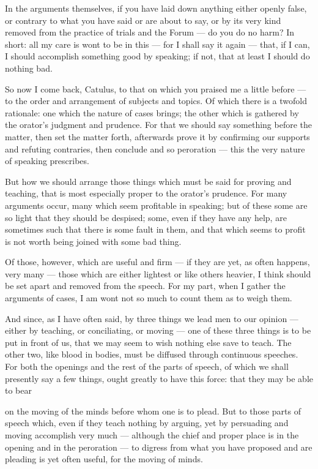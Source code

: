  In the arguments themselves, if you have laid down anything either openly false, or contrary to what you have said or are about to say, or by its very kind removed from the practice of trials and the Forum — do you do no harm? In short: all my care is wont to be in this — for I shall say it again — that, if I can, I should accomplish something good by speaking; if not, that at least I should do nothing bad.

 So now I come back, Catulus, to that on which you praised me a little before — to the order and arrangement of subjects and topics. Of which there is a twofold rationale: one which the nature of cases brings; the other which is gathered by the orator's judgment and prudence. For that we should say something before the matter, then set the matter forth, afterwards prove it by confirming our supports and refuting contraries, then conclude and so peroration — this the very nature of speaking prescribes.

 But how we should arrange those things which must be said for proving and teaching, that is most especially proper to the orator's prudence. For many arguments occur, many which seem profitable in speaking; but of these some are so light that they should be despised; some, even if they have any help, are sometimes such that there is some fault in them, and that which seems to profit is not worth being joined with some bad thing.

 Of those, however, which are useful and firm — if they are yet, as often happens, very many — those which are either lightest or like others heavier, I think should be set apart and removed from the speech. For my part, when I gather the arguments of cases, I am wont not so much to count them as to weigh them.

 And since, as I have often said, by three things we lead men to our opinion — either by teaching, or conciliating, or moving — one of these three things is to be put in front of us, that we may seem to wish nothing else save to teach. The other two, like blood in bodies, must be diffused through continuous speeches. For both the openings and the rest of the parts of speech, of which we shall presently say a few things, ought greatly to have this force: that they may be able to bear

 on the moving of the minds before whom one is to plead. But to those parts of speech which, even if they teach nothing by arguing, yet by persuading and moving accomplish very much — although the chief and proper place is in the opening and in the peroration — to digress from what you have proposed and are pleading is yet often useful, for the moving of minds.

